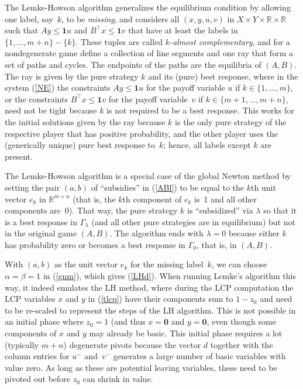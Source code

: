 \documentclass[a4paper,12pt]{article}  %
\theoremstyle{definition}
\def\reals{{\mathbb R}}
\newcommand{\T}{^{\top}}
\newcommand{\0}{{\mathbf0}}
\newcommand{\1}{{\mathbf1}}
\begin{document}
The Lemke-Howson algorithm generalizes the equilibrium
condition by allowing one label, say~$k$, to be
\textit{missing}, and considers all $(x,y,u,v)$
in $X\times Y\times\reals\times\reals$
such that $Ay\le\1u$ and $B\T x\le\1v$
that have at least the labels in $\{1,\ldots,m+n\}-\{k\}$.
These tuples are called \textit{$k$-almost complementary},
and for a nondegenerate game define a collection of line
segments and one ray that form a set of paths and cycles.
The endpoints of the paths are the equilibria of $(A,B)$.
The ray is given by the pure strategy $k$ and its (pure)
best response, where in the system (\ref{NE}) the
constraints $Ay\le\1u$ for the payoff
variable $u$ if $k\in\{1,\ldots,m\}$, or the constraints
$B\T x\le\1v$ for the payoff variable~$v$ if
$k\in\{m+1,\ldots,m+n\}$, need not be tight
because $k$ is not required to be a best response.
This works for the initial solutions given by the ray
because $k$ is the only pure strategy of the respective
player that has positive probability, and the other player
uses the (generically unique) pure best response to~$k$;
hence, all labels except $k$ are present.

The Lemke-Howson algorithm is a special case of the global
Newton method by setting the pair $(a,b)$ of ``subsidies''
in (\ref{ABl}) to be equal to the $k$th unit vector $e_k$ in
$\reals^{m+n}$ (that is, the $k$th component of $e_k$ is~1
and all other components are~0).
That way, the pure strategy $k$ is ``subsidized'' via
$\lambda$ so that it is a best response in $\Gamma_\lambda$
(and all other pure strategies are in equilibrium) but not
in the original game $(A,B)$. 
The algorithm ends with $\lambda=0$ because either $k$ has
probability zero or becomes a best response in $\Gamma_0$,
that is, in $(A,B)$.

With $(a,b)$ as the unit vector $e_k$ for the missing
label~$k$, we can choose $\alpha=\beta=1$ in (\ref{gnm}),
which gives (\ref{LHd}).
When running Lemke's algorithm this way, it indeed emulates
the LH method, where during the LCP computation the LCP
variables $x$ and $y$ in (\ref{tlcp}) have their components
sum to $1-z_0$ and need to be re-scaled to represent the
steps of the LH algorithm.
This is not possible in an initial phase where $z_0=1$ (and
thus $x=\0$ and $y=\0$, even though some components of $x$
and $y$ may already be basic.
This initial phase requires a lot (typically $m+n$)
degenerate pivots because the vector $d$ together with the
column entries for $u^-$ and~$v^-$ generates a large number
of basic variables with value zero.
As long as these are potential leaving variables, these need
to be pivoted out before $z_0$ can shrink in value.
\end{document}
